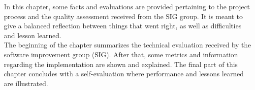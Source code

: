 In this chapter, some facts and evaluations are provided pertaining to the project process and the quality assessment received from the SIG group. It is meant to give a balanced reflection between things that went right, as well as difficulties and lesson learned.\\

The beginning of the chapter summarizes the technical evaluation received by the software improvement group (SIG). After that, some metrics and information regarding the implementation are shown and explained. The final part of this chapter concludes with a self-evaluation where performance and lessons learned are illustrated.    